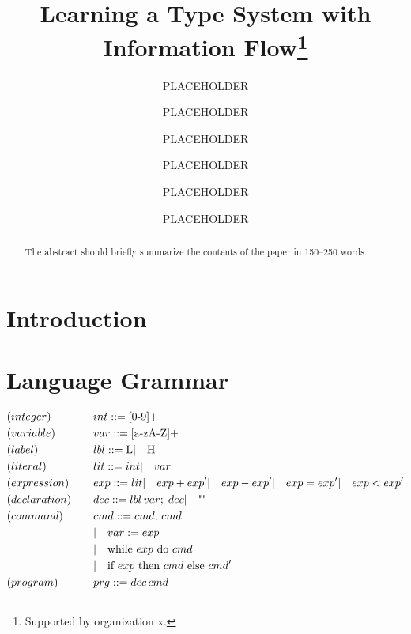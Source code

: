\documentclass[runningheads]{llncs}
\newcommand{\mI}{\hspace{0.5em | \hspace{0.5em}} }
\begin{document}
%
\title{Learning a Type System with Information Flow\thanks{Supported by organization x.}}
%
%
\author{PLACEHOLDER \and PLACEHOLDER \and PLACEHOLDER \and PLACEHOLDER \and PLACEHOLDER \and PLACEHOLDER}
%
%
%
\maketitle              %
%
\begin{abstract}
The abstract should briefly summarize the contents of the paper in
150--250 words.

\end{abstract}
%
%
%
\section{Introduction}

\section{Language Grammar}
\begin{alignat*}{3}
&(integer)      \quad &&int ::= \text{[0-9]+}\\
&(variable)     \quad &&var ::= \text{[a-zA-Z]+}\\
&(label)        \quad &&lbl ::= \text{L} \mI \text{H}\\
&(literal)      \quad &&lit ::= int \mI var\\
&(expression)   \quad &&exp ::= lit \mI exp + exp' \mI exp - exp' \mI exp = exp' \mI exp < exp'\\
&(declaration)  \quad &&dec ::= lbl \, var; \; dec \mI \text{""}\\
&(command)      \quad &&cmd ::= cmd; \, cmd\\
&&& \mI  var := exp\\
&&& \mI  \text{while $exp$ do $cmd$}\\
&&& \mI  \text{if $exp$ then $cmd$ else $cmd'$}\\
&(program)      \quad &&prg ::= dec \, cmd
\end{alignat*}
\end{document}
